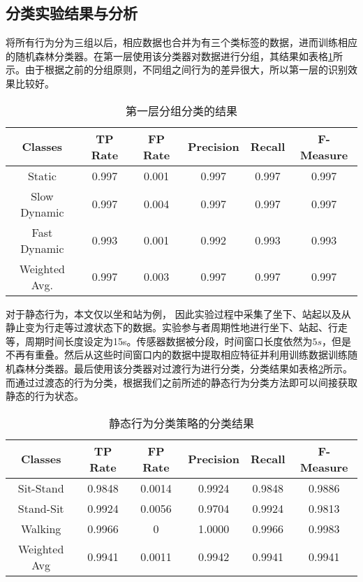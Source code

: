 \subsection{分类实验结果与分析}
\par 将所有行为分为三组以后，相应数据也合并为有三个类标签的数据，进而训练相应的随机森林分类器。在第一层使用该分类器对数据进行分组，其结果如表格\ref{first_level_result}所示。由于根据之前的分组原则，不同组之间行为的差异很大，所以第一层的识别效果比较好。
    \begin{table}[!ht]
    \centering
    \caption{第一层分组分类的结果}\label{first_level_result}
    \begin{tabular}{cccccc}
    \toprule
    Classes & TP Rate & FP Rate & Precision & Recall & F-Measure \\
    \midrule
    Static & 0.997 & 0.001 & 0.997 & 0.997 & 0.997 \\
    Slow Dynamic & 0.997 & 0.004 & 0.997 & 0.997 & 0.997 \\
    Fast Dynamic & 0.993 & 0.001 & 0.992 & 0.993 & 0.993\\
    \hline
    Weighted Avg. & 0.997 & 0.003 & 0.997 & 0.997 & 0.997\\
    \bottomrule
    \end{tabular}
    \end{table}
\par 对于静态行为，本文仅以坐和站为例， 因此实验过程中采集了坐下、站起以及从静止变为行走等过渡状态下的数据。实验参与者周期性地进行坐下、站起、行走等，周期时间长度设定为15s。传感器数据被分段，时间窗口长度依然为$5s$，但是不再有重叠。然后从这些时间窗口内的数据中提取相应特征并利用训练数据训练随机森林分类器。最后使用该分类器对过渡行为进行分类，分类结果如表格\ref{static_result}所示。而通过过渡态的行为分类，根据我们之前所述的静态行为分类方法即可以间接获取静态的行为状态。

\begin{table}[!ht]
    \centering
    \caption{静态行为分类策略的分类结果}\label{static_result}
    \begin{tabular}{cccccc}
    \toprule
    Classes & TP Rate & FP Rate & Precision & Recall & F-Measure \\
    \midrule
    Sit-Stand & 0.9848 & 0.0014 & 0.9924 & 0.9848 & 0.9886\\
    Stand-Sit & 0.9924 & 0.0056 & 0.9704 & 0.9924 & 0.9813\\
    Walking & 0.9966 & 0 & 1.0000 & 0.9966 & 0.9983\\
    \hline
    Weighted Avg & 0.9941 & 0.0011 & 0.9942 & 0.9941 & 0.9941\\
    \bottomrule
    \end{tabular}
 \end{table}

